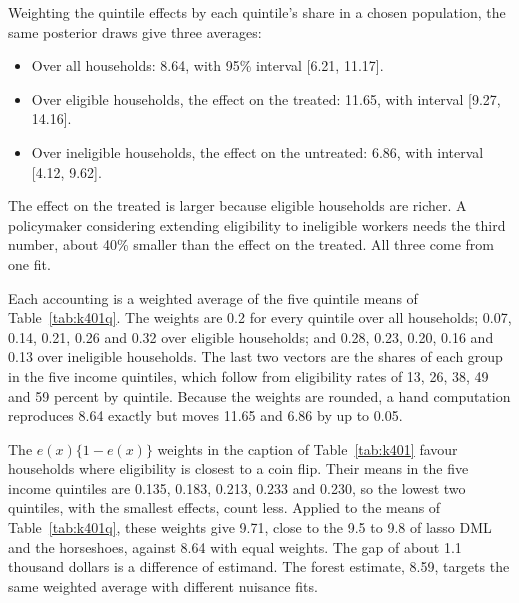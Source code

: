 Weighting the quintile effects by each quintile's share in a chosen population, the same posterior draws give three averages:
\begin{itemize}
\item Over all households: 8.64, with 95\% interval [6.21, 11.17].
\item Over eligible households, the effect on the treated: 11.65, with interval [9.27, 14.16].
\item Over ineligible households, the effect on the untreated: 6.86, with interval [4.12, 9.62].
\end{itemize}
The effect on the treated is larger because eligible households are richer. A policymaker considering extending eligibility to ineligible workers needs the third number, about 40\% smaller than the effect on the treated. All three come from one fit.

Each accounting is a weighted average of the five quintile means of Table~\ref{tab:k401q}. The weights are 0.2 for every quintile over all households; 0.07, 0.14, 0.21, 0.26 and 0.32 over eligible households; and 0.28, 0.23, 0.20, 0.16 and 0.13 over ineligible households. The last two vectors are the shares of each group in the five income quintiles, which follow from eligibility rates of 13, 26, 38, 49 and 59 percent by quintile. Because the weights are rounded, a hand computation reproduces 8.64 exactly but moves 11.65 and 6.86 by up to 0.05.

The $e(x)\{1 - e(x)\}$ weights in the caption of Table~\ref{tab:k401} favour households where eligibility is closest to a coin flip. Their means in the five income quintiles are 0.135, 0.183, 0.213, 0.233 and 0.230, so the lowest two quintiles, with the smallest effects, count less. Applied to the means of Table~\ref{tab:k401q}, these weights give 9.71, close to the 9.5 to 9.8 of lasso DML and the horseshoes, against 8.64 with equal weights. The gap of about 1.1 thousand dollars is a difference of estimand. The forest estimate, 8.59, targets the same weighted average with different nuisance fits.

